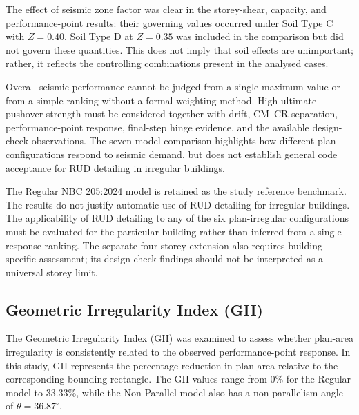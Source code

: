 The effect of seismic zone factor was clear in the storey-shear, capacity, and performance-point results: their governing values occurred under Soil Type C with $Z=0.40$. Soil Type D at $Z=0.35$ was included in the comparison but did not govern these quantities. This does not imply that soil effects are unimportant; rather, it reflects the controlling combinations present in the analysed cases.

Overall seismic performance cannot be judged from a single maximum value or from a simple ranking without a formal weighting method. High ultimate pushover strength must be considered together with drift, CM--CR separation, performance-point response, final-step hinge evidence, and the available design-check observations. The seven-model comparison highlights how different plan configurations respond to seismic demand, but does not establish general code acceptance for RUD detailing in irregular buildings.

The Regular NBC 205:2024 model is retained as the study reference benchmark. The results do not justify automatic use of RUD detailing for irregular buildings. The applicability of RUD detailing to any of the six plan-irregular configurations must be evaluated for the particular building rather than inferred from a single response ranking. The separate four-storey extension also requires building-specific assessment; its design-check findings should not be interpreted as a universal storey limit.

\subsection{Geometric Irregularity Index (GII)}
The Geometric Irregularity Index (GII) was examined to assess whether plan-area irregularity is consistently related to the observed performance-point response. In this study, GII represents the percentage reduction in plan area relative to the corresponding bounding rectangle. The GII values range from 0\% for the Regular model to 33.33\%, while the Non-Parallel model also has a non-parallelism angle of $\theta = 36.87^{\circ}$.

